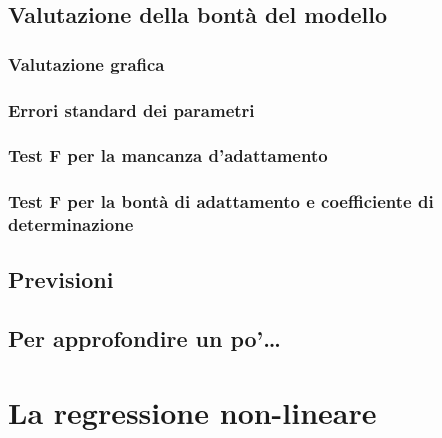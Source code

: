 \documentclass[a4paper,12pt,oneside]{book}
\begin{document}
\hypertarget{valutazione-della-bonta-del-modello}{%
\section{Valutazione della bontà del modello}\label{valutazione-della-bonta-del-modello}}

\hypertarget{valutazione-grafica}{%
\subsection{Valutazione grafica}\label{valutazione-grafica}}

\hypertarget{errori-standard-dei-parametri}{%
\subsection{Errori standard dei parametri}\label{errori-standard-dei-parametri}}

\hypertarget{test-f-per-la-mancanza-dadattamento}{%
\subsection{Test F per la mancanza d'adattamento}\label{test-f-per-la-mancanza-dadattamento}}

\hypertarget{test-f-per-la-bonta-di-adattamento-e-coefficiente-di-determinazione}{%
\subsection{Test F per la bontà di adattamento e coefficiente di determinazione}\label{test-f-per-la-bonta-di-adattamento-e-coefficiente-di-determinazione}}

\hypertarget{previsioni}{%
\section{Previsioni}\label{previsioni}}

\hypertarget{per-approfondire-un-po-8}{%
\section{Per approfondire un po'\ldots{}}\label{per-approfondire-un-po-8}}

\hypertarget{la-regressione-non-lineare}{%
\chapter{La regressione non-lineare}\label{la-regressione-non-lineare}}
\end{document}
